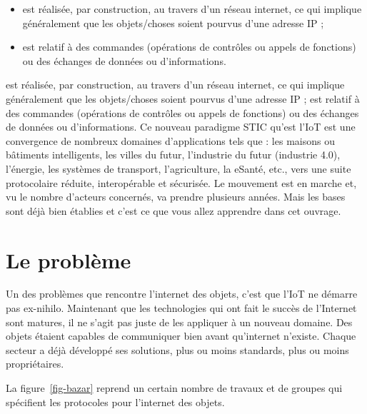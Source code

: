 \begin{itemize}
    \item est réalisée, par construction, au travers d’un réseau internet, ce qui implique généralement que les objets/choses soient pourvus d’une adresse IP ;
    \item est relatif à des commandes (opérations de contrôles ou appels de fonctions) ou des échanges de données ou d’informations.
\end{itemize}
est réalisée, par construction, au travers d’un réseau internet, ce qui implique généralement que les objets/choses soient pourvus d’une adresse IP ;
est relatif à des commandes (opérations de contrôles ou appels de fonctions) ou des échanges de données ou d’informations.
Ce nouveau paradigme \ac{STIC} qu’est l’IoT est une convergence de nombreux domaines d’applications tels que : les maisons ou bâtiments intelligents, les villes du futur, l’industrie du futur (industrie 4.0), l’énergie, les systèmes de transport, l’agriculture, la eSanté, etc., vers une suite protocolaire réduite, interopérable et sécurisée. Le mouvement est en marche et, vu le nombre d'acteurs concernés, va prendre plusieurs années. Mais les bases sont déjà bien établies et c'est ce que vous allez apprendre dans cet ouvrage.

 \vspace{2em}
 
\section{Le problème}

  \vspace{1em}

Un des problèmes que rencontre l’internet des objets, c’est que l’IoT ne démarre pas ex-nihilo. Maintenant que les technologies qui ont fait le succès de l'Internet sont matures, il ne s'agit pas juste de les appliquer à un nouveau domaine. Des objets étaient capables de communiquer bien avant qu’internet n’existe. Chaque secteur a déjà développé ses solutions, plus ou moins standards, plus ou moins propriétaires.

La figure~\vref{fig-bazar} reprend un certain nombre de travaux et de groupes qui spécifient les protocoles pour l’internet des objets. 

